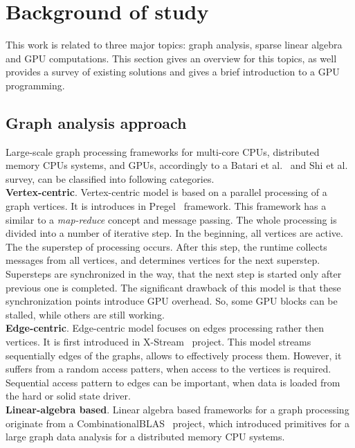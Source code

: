 \section{Background of study}

This work is related to three major topics: graph analysis, sparse linear algebra and GPU computations. This section gives an overview for this topics, as well provides a survey of existing solutions and gives a brief introduction to a GPU programming.

\subsection{Graph analysis approach}

Large-scale graph processing frameworks for multi-core CPUs, distributed memory CPUs systems, and GPUs, accordingly to a Batari et al.~\cite{article:batarfi_survey_graphs} and Shi et al.~\cite{article:shi_survey_graphs} survey, can be classified into following categories.\\

\textbf{Vertex-centric}. Vertex-centric model is based on a parallel processing of a graph vertices. It is introduces in Pregel~\cite{article:pregel} framework. This framework has a similar to a \textit{map-reduce} concept and message passing. The whole processing is divided into a number of iterative step. In the beginning, all vertices are active. The the superstep of processing occurs. After this step, the runtime collects messages from all vertices, and determines vertices for the next superstep. Supersteps are synchronized in the way, that the next step is started only after previous one is completed. The significant drawback of this model is that these synchronization points introduce GPU overhead. So, some GPU blocks can be stalled, while others are still working.\\   

\textbf{Edge-centric}. Edge-centric model focuses on edges processing rather then vertices. It is first introduced in X-Stream~\cite{article:xstream} project. This model streams sequentially edges of the graphs, allows to effectively process them. However, it suffers from a random access patters, when access to the vertices is required. Sequential access pattern to edges can be important, when data is loaded from the hard or solid state driver.\\

\textbf{Linear-algebra based}. Linear algebra based frameworks for a graph processing originate from a CombinationalBLAS~\cite{article:combblas} project, which introduced primitives for a large graph data analysis for a distributed memory CPU systems. 

